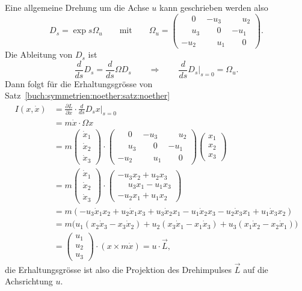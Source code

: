 \begin{beispiel}
Eine allgemeine Drehung um die Achse $u$ kann geschrieben werden also
\[
D_s
=
\exp s\Omega_u
\qquad\text{mit}\qquad
\Omega_u
=
\begin{pmatrix}
\phantom{-}0   &         - u_3 & \phantom{-}u_2\\
\phantom{-}u_3 &\phantom{-}0   &          - u_1\\
         - u_2 &\phantom{-}u_1 & \phantom{-}0
\end{pmatrix}.
\]
Die Ableitung von $D_s$ ist
\[
\frac{d}{ds} D_s
=
\frac{d}{ds} \Omega D_s
\qquad\Rightarrow\qquad
\frac{d}{ds}D_s\bigg|_{s=0}
=
\Omega_u.
\]
Dann folgt für die Erhaltungsgrösse
von Satz~\ref{buch:symmetrien:noether:satz:noether} 
\begin{align*}
I(x,\dot{x})
&=
\frac{\partial L}{\partial\dot{x}}
\cdot
\frac{d}{ds}D_sx\bigg|_{s=0}
\\
&=
m\dot{x}
\cdot
\Omega x
\\
&=
m
\begin{pmatrix}
\dot{x}_1\\
\dot{x}_2\\
\dot{x}_3
\end{pmatrix}
\cdot
\begin{pmatrix}
\phantom{-}0   &         - u_3 & \phantom{-}u_2\\
\phantom{-}u_3 &\phantom{-}0   &          - u_1\\
         - u_2 &\phantom{-}u_1 & \phantom{-}0
\end{pmatrix}
\begin{pmatrix}
x_1\\x_2\\x_3
\end{pmatrix}
\\
&=
m
\begin{pmatrix}
\dot{x}_1\\
\dot{x}_2\\
\dot{x}_3
\end{pmatrix}
\cdot
\begin{pmatrix}
          -u_3x_2+u_2x_3\\
\phantom{-}u_3x_1       -u_1x_3\\
          -u_2x_1+u_1x_2    
\end{pmatrix}
\\
&=
m(
- u_3 \dot{x}_1 x_2
+ u_2 \dot{x}_1 x_3
+ u_3 \dot{x}_2 x_1
- u_1 \dot{x}_2 x_3
- u_2 \dot{x}_3 x_1
+ u_1 \dot{x}_3 x_2
)
\\
&=
m\bigl(
u_1(x_2\dot{x}_3 - x_3\dot{x}_2)
+
u_2(x_3\dot{x}_1-x_1\dot{x}_3)
+
u_3(x_1\dot{x}_2-x_2\dot{x}_1)
\bigr)
\\
&=
\begin{pmatrix}u_1\\u_2\\u_3\end{pmatrix}
\cdot
(x\times m\dot{x})
=
u\cdot \vec{L},
\end{align*}
die Erhaltungsgrösse ist also die Projektion des Drehimpulses $\vec{L}$
auf die Achsrichtung $u$.
\end{beispiel}

